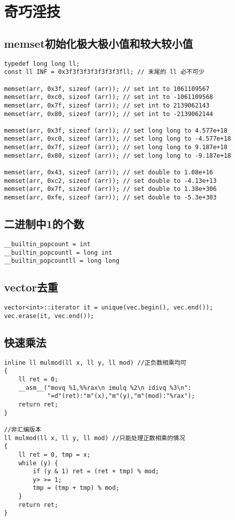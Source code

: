 \clearpage
\section{奇巧淫技}

\subsection{memset初始化极大极小值和较大较小值}
\begin{lstlisting}
typedef long long ll;
const ll INF = 0x3f3f3f3f3f3f3f3fll; // 末尾的 ll 必不可少

memset(arr, 0x3f, sizeof (arr)); // set int to 1061109567
memset(arr, 0xc0, sizeof (arr)); // set int to -1061109568
memset(arr, 0x7f, sizeof (arr)); // set int to 2139062143
memset(arr, 0x80, sizeof (arr)); // set int to -2139062144

memset(arr, 0x3f, sizeof (arr)); // set long long to 4.577e+18
memset(arr, 0xc0, sizeof (arr)); // set long long to -4.577e+18
memset(arr, 0x7f, sizeof (arr)); // set long long to 9.187e+18
memset(arr, 0x80, sizeof (arr)); // set long long to -9.187e+18

memset(arr, 0x43, sizeof (arr)); // set double to 1.08e+16
memset(arr, 0xc2, sizeof (arr)); // set double to -4.13e+13
memset(arr, 0x7f, sizeof (arr)); // set double to 1.38e+306
memset(arr, 0xfe, sizeof (arr)); // set double to -5.3e+303
\end{lstlisting}

\subsection{二进制中1的个数}
\begin{lstlisting}
__builtin_popcount = int
__builtin_popcountl = long int
__builtin_popcountll = long long
\end{lstlisting}

\subsection{vector去重}
\begin{lstlisting}
vector<int>::iterator it = unique(vec.begin(), vec.end());
vec.erase(it, vec.end());
\end{lstlisting}

\subsection{快速乘法}
\begin{lstlisting}
inline ll mulmod(ll x, ll y, ll mod) //正负数相乘均可
{
	ll ret = 0;
	__asm__("movq %1,%%rax\n imulq %2\n idivq %3\n":
            "=d"(ret):"m"(x),"m"(y),"m"(mod):"%rax");
	return ret;
}

//非汇编版本
ll mulmod(ll x, ll y, ll mod) //只能处理正数相乘的情况
{
	ll ret = 0, tmp = x;
	while (y) {
		if (y & 1) ret = (ret + tmp) % mod;
		y> >= 1;
		tmp = (tmp + tmp) % mod;
	}
	return ret;
}
\end{lstlisting}

